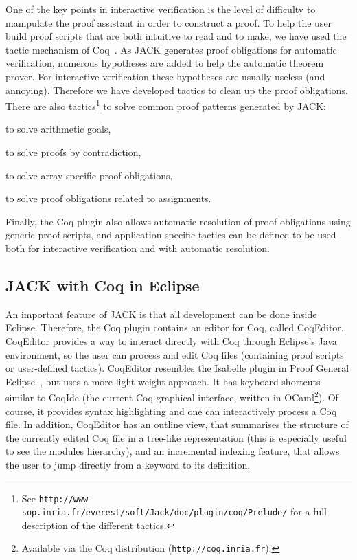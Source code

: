One of the key points in interactive verification is the level of
difficulty to manipulate the proof assistant in order to construct a
proof.  To help the user build proof scripts that are both intuitive
to read and to make, we have used the tactic mechanism of
Coq~\cite{DEL-00-LTAC}.  As JACK generates proof obligations for
automatic verification, numerous hypotheses are added to help the
automatic theorem prover. For interactive verification these
hypotheses are usually useless (and annoying). Therefore we have
developed tactics to clean up the proof obligations. There are also
tactics\footnote{ See
\texttt{http://www-sop.inria.fr/everest/soft/Jack/doc/plugin/coq/Prelude/}
for a full description of the different tactics.}  to solve common
proof patterns generated by JACK: 
\begin{inparaenum}
\item to solve arithmetic goals,
\item to solve proofs by contradiction,
\item to solve array-specific proof obligations,
\item to solve proof obligations related to assignments.
\end{inparaenum}
Finally, the Coq plugin also allows automatic resolution of proof
obligations using generic proof scripts, and application-specific
tactics can be defined to be used both for interactive verification
and with automatic resolution.



\subsection{JACK with Coq in Eclipse}

An important feature of JACK is that all development can be done
inside Eclipse.  Therefore, the Coq plugin contains an editor for Coq,
called CoqEditor. CoqEditor provides a way to interact directly with
Coq through Eclipse's Java environment, so the user can process and
edit Coq files (containing proof scripts or user-defined tactics).
CoqEditor resembles the Isabelle plugin in Proof General
Eclipse~\cite{WintersteinAL05}, but uses a more light-weight approach.
It has keyboard shortcuts similar to CoqIde (the current Coq graphical
interface, written in OCaml\footnote{Available via the Coq
distribution (\texttt{http://coq.inria.fr}).}). Of course, it provides
syntax highlighting and one can interactively process a Coq file.  In
addition, CoqEditor has an outline view, that summarises the structure
of the currently edited Coq file in a tree-like representation (this
is especially useful to see the modules hierarchy), and an incremental
indexing feature, that allows the user to jump directly from a keyword
to its definition.

